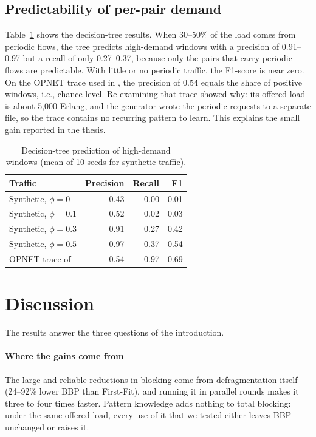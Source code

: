 \documentclass[preprint,12pt]{elsarticle}
\begin{document}
\subsection{Predictability of per-pair demand}
Table~\ref{tab:dt} shows the decision-tree results. When 30--50\% of the load comes from periodic flows, the tree predicts high-demand windows with a precision of 0.91--0.97 but a recall of only 0.27--0.37, because only the pairs that carry periodic flows are predictable. With little or no periodic traffic, the F1-score is near zero. On the OPNET trace used in \cite{malayeri2022}, the precision of 0.54 equals the share of positive windows, i.e., chance level. Re-examining that trace showed why: its offered load is about 5{,}000 Erlang, and the generator wrote the periodic requests to a separate file, so the trace contains no recurring pattern to learn. This explains the small gain reported in the thesis.

\begin{table}[t]
\centering
\caption{Decision-tree prediction of high-demand windows (mean of 10 seeds for synthetic traffic).}
\label{tab:dt}
\small
\begin{tabular}{@{}lrrr@{}}
\toprule
Traffic & Precision & Recall & F1 \\
\midrule
Synthetic, $\phi=0$ & 0.43 & 0.00 & 0.01 \\
Synthetic, $\phi=0.1$ & 0.52 & 0.02 & 0.03 \\
Synthetic, $\phi=0.3$ & 0.91 & 0.27 & 0.42 \\
Synthetic, $\phi=0.5$ & 0.97 & 0.37 & 0.54 \\
OPNET trace of \cite{malayeri2022} & 0.54 & 0.97 & 0.69 \\
\bottomrule
\end{tabular}
\end{table}

\section{Discussion}\label{sec:discussion}
The results answer the three questions of the introduction.

\paragraph{Where the gains come from} The large and reliable reductions in blocking come from defragmentation itself (24--92\% lower BBP than First-Fit), and running it in parallel rounds makes it three to four times faster. Pattern knowledge adds nothing to total blocking: under the same offered load, every use of it that we tested either leaves BBP unchanged or raises it.
\end{document}
